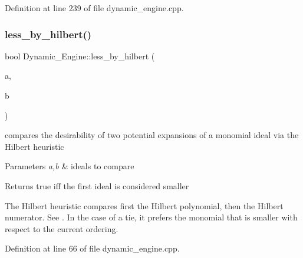 Definition at line 239 of file dynamic\+\_\+engine.\+cpp.

\mbox{\label{namespace_dynamic___engine_acb9d5de295d3d96abfa40dd47ae41c1f}} 
\subsubsection{\texorpdfstring{less\+\_\+by\+\_\+hilbert()}{less\_by\_hilbert()}}
{\footnotesize\ttfamily bool Dynamic\+\_\+\+Engine\+::less\+\_\+by\+\_\+hilbert (\begin{DoxyParamCaption}\item[{\hyperlink{group___g_b_computation_class_dynamic___engine_1_1_p_p___with___ideal}{P\+P\+\_\+\+With\+\_\+\+Ideal} \&}]{a,  }\item[{\hyperlink{group___g_b_computation_class_dynamic___engine_1_1_p_p___with___ideal}{P\+P\+\_\+\+With\+\_\+\+Ideal} \&}]{b }\end{DoxyParamCaption})}



compares the desirability of two potential expansions of a monomial ideal via the Hilbert heuristic 


\begin{DoxyParams}{Parameters}
{\em a,b} & ideals to compare \\
\hline
\end{DoxyParams}
\begin{DoxyReturn}{Returns}
{\ttfamily true} iff the first ideal is considered smaller
\end{DoxyReturn}
The Hilbert heuristic compares first the Hilbert polynomial, then the Hilbert numerator. See \cite{CaboaraDynAlg}. In the case of a tie, it prefers the monomial that is smaller with respect to the current ordering. 

Definition at line 66 of file dynamic\+\_\+engine.\+cpp.

\mbox{\label{namespace_dynamic___engine_afe48703afece2137e511824b00ccad39}} 

